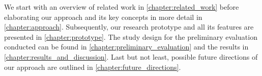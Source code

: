 We start with an overview of related work in \autoref{chapter:related_work} before elaborating our approach and its key concepts in more detail in \autoref{chapter:approach}. Subsequently, our research prototype and all its features are presented in \autoref{chapter:prototype}. The study design for the preliminary evaluation conducted can be found in \autoref{chapter:preliminary_evaluation} and the results in \autoref{chapter:results_and_discussion}. Last but not least, possible future directions of our approach are outlined in \autoref{chapter:future_directions}.